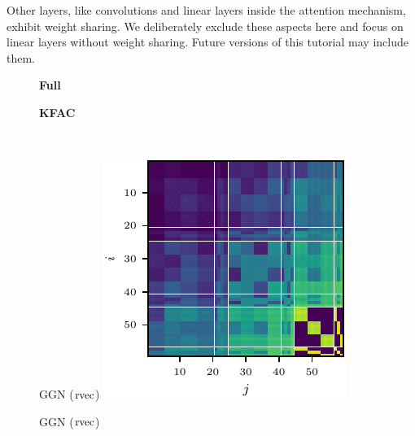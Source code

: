 Other layers, like convolutions and linear layers inside the attention mechanism, exhibit weight sharing.
We deliberately exclude these aspects here and focus on linear layers without weight sharing.
Future versions of this tutorial may include them.

\switchcolumn[1]
\begin{figure}[!h]
  \centering
  \begin{minipage}[t]{0.485\linewidth}
    \centering
    \textbf{Full}
  \end{minipage}
  \hfill
  \begin{minipage}[t]{0.485\linewidth}
    \centering
    \textbf{KFAC}
  \end{minipage}
  \\
  \begin{minipage}[t]{0.485\linewidth}
    \centering
    GGN ($\operatorname{rvec}$)\vspace{1ex}
    \includegraphics[width=\linewidth]{../kfs/plots/synthetic_rvec_ggn_full.pdf}
  \end{minipage}
  \hfill
  \begin{minipage}[t]{0.485\linewidth}
    \centering
    GGN ($\operatorname{rvec}$)\vspace{1ex}

\end{minipage}
\end{figure}
